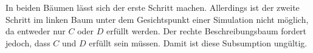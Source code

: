 \begin{center}
\begin{minipage}{0.4\textwidth}
\end{minipage}
\begin{minipage}{0.4\textwidth}
\end{minipage}
\end{center}

In beiden Bäumen lässt sich der erste Schritt machen. Allerdings ist der zweite
Schritt im linken Baum unter dem Gesichtspunkt einer Simulation nicht möglich,
da entweder nur $C$ oder $D$ erfüllt werden. Der rechte Beschreibungsbaum
fordert jedoch, dass $C$ und $D$ erfüllt sein müssen. Damit ist diese
Subsumption ungültig.
